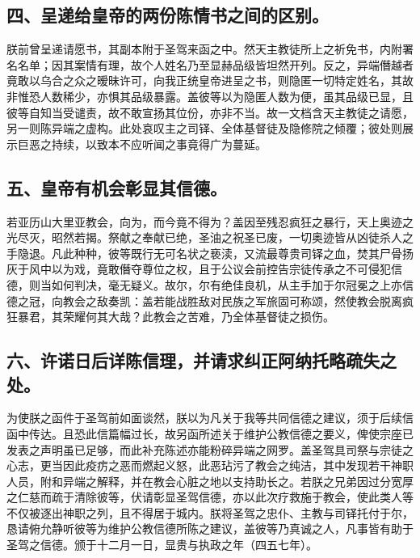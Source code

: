 
\subsection{四、呈递给皇帝的两份陈情书之间的区别。}

朕前曾呈递请愿书，其副本附于圣驾来函之中。然天主教徒所上之祈免书，内附署名名单；因其案情有理，故个人姓名乃至显赫品级皆坦然开列。反之，异端僭越者竟敢以乌合之众之暧昧许可，向我正统皇帝进呈之书，则隐匿一切特定姓名，其故非惟恐人数稀少，亦惧其品级暴露。盖彼等以为隐匿人数为便，虽其品级已显，且彼等自知当受谴责，故不敢宣扬其位份，亦非不当。故一文档含天主教徒之请愿，另一则陈异端之虚构。此处哀叹主之司铎、全体基督徒及隐修院之倾覆；彼处则展示巨恶之持续，以致本不应听闻之事竟得广为蔓延。\par


\subsection{五、皇帝有机会彰显其信德。}

若亚历山大里亚教会，向为，而今竟不得为？盖因至残忍疯狂之暴行，天上奥迹之光尽灭，昭然若揭。祭献之奉献已绝，圣油之祝圣已废，一切奥迹皆从凶徒杀人之手隐退。凡此种种，彼等既行无可名状之亵渎，又流最尊贵司铎之血，焚其尸骨扬灰于风中以为戏，竟敢僭夺尊位之权，且于公议会前控告宗徒传承之不可侵犯信德，则当如何判决，毫无疑义。故尔，尔有绝佳良机，从主手加于尔冠冕之上亦信德之冠，向教会之敌奏凯：盖若能战胜敌对民族之军旅固可称颂，然使教会脱离疯狂暴君，其荣耀何其大哉？此教会之苦难，乃全体基督徒之损伤。\par


\subsection{六、许诺日后详陈信理，并请求纠正阿纳托略疏失之处。}

为使朕之函件于圣驾前如面谈然，朕以为凡关于我等共同信德之建议，须于后续信函中传达。且恐此信篇幅过长，故另函所述关于维护公教信德之要义，俾使宗座已发表之声明虽已足够，而此补充陈述亦能粉碎异端之网罗。盖圣驾具司祭与宗徒之心志，更当因此疫疠之恶而燃起义怒，此恶玷污了教会之纯洁，其中发现若干神职人员，附和异端之解释，并在教会心脏之地以支持助长之。若朕之兄弟因过分宽厚之仁慈而疏于清除彼等，伏请彰显圣驾信德，亦以此次疗救施于教会，使此类人等不仅被逐出神职之列，且不得居于城内。朕将圣驾之忠仆、主教与司铎托付于尔，恳请俯允静听彼等为维护公教信德所陈之建议，盖彼等乃真诚之人，凡事皆有助于圣驾之信德。颁于十二月一日，显贵与执政之年（四五七年）。\par

